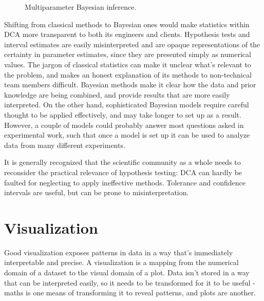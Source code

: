 \documentclass[11pt,a4paper,article]{memoir} %
\begin{document}
\begin{figure}
\centering
{}
\caption{Multiparameter Bayesian inference.}
\label{fig:multiparameter_bayes}
\end{figure}

Shifting from classical methods to Bayesian ones would make statistics within DCA more transparent to both its engineers and clients. Hypothesis tests and interval estimates are easily misinterpreted and are opaque representations of the certainty in parameter estimates, since they are presented simply as numerical values. The jargon of classical statistics can make it unclear what's relevant to the problem, and makes an honest explanation of its methods to non-technical team members difficult. Bayesian methods make it clear how the data and prior knowledge are being combined, and provide results that are more easily interpreted. On the other hand, sophisticated Bayesian models require careful thought to be applied effectively, and  may take longer to set up as a result. However, a couple of models could probably answer most questions asked in experimental work, such that once a model is set up it can be used to analyze data from many different experiments.
\par
It is generally recognized that the scientific community as a whole needs to reconsider the practical relevance of hypothesis testing: DCA can hardly be faulted for neglecting to apply ineffective methods. Tolerance and confidence intervals are useful, but can be prone to misinterpretation. 

\section{Visualization}
\label{suggested_vis}
Good visualization exposes patterns in data in a way that's immediately interpretable and precise. A visualization is a mapping from the numerical domain of a dataset to the visual domain of a plot. Data isn't stored in a way that can be interpreted easily, so it needs to be transformed for it to be useful - maths is one means of transforming it to reveal patterns, and plots are another.
\end{document}
